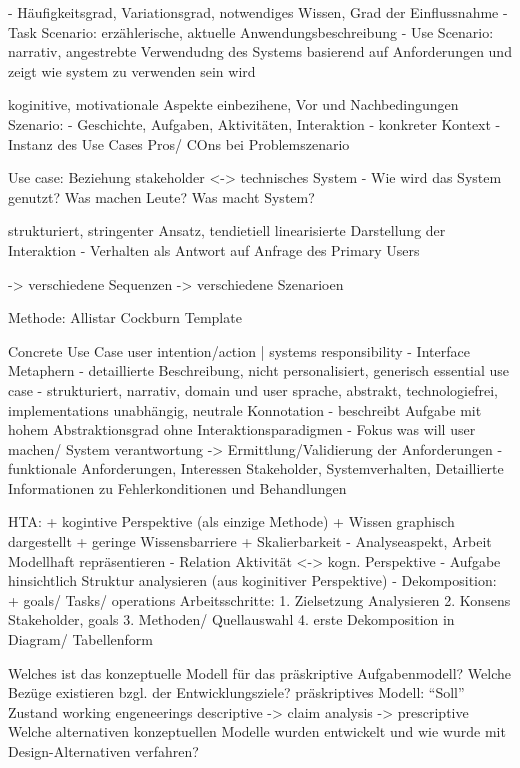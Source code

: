 {\color{blue}
 - Häufigkeitsgrad, Variationsgrad, notwendiges Wissen, Grad der Einflussnahme
        	- Task Scenario: erzählerische, aktuelle Anwendungsbeschreibung
        	- Use Scenario: narrativ, angestrebte Verwendudng des Systems basierend auf Anforderungen und zeigt wie system zu verwenden sein wird
 
koginitive, motivationale Aspekte einbezihene, Vor und Nachbedingungen
Szenario:
        	- Geschichte, Aufgaben, Aktivitäten, Interaktion
        	- konkreter Kontext
        	- Instanz des Use Cases
Pros/ COns bei Problemszenario
 
Use case: Beziehung stakeholder <-> technisches System
        	- Wie wird das System genutzt? Was machen Leute? Was macht System?
        	
strukturiert, stringenter Ansatz, tendietiell linearisierte Darstellung der Interaktion
        	- Verhalten als Antwort auf Anfrage des Primary Users
 
        	-> verschiedene Sequenzen -> verschiedene Szenarioen
 
Methode: Allistar Cockburn Template
 
Concrete Use Case
user intention/action | systems responsibility
- Interface Metaphern
- detaillierte Beschreibung, nicht personalisiert, generisch
essential use case
        	- strukturiert, narrativ, domain und user sprache, abstrakt, technologiefrei, implementations unabhängig, neutrale Konnotation
        	- beschreibt Aufgabe mit hohem Abstraktionsgrad ohne Interaktionsparadigmen
        	- Fokus was will user machen/ System verantwortung
-> Ermittlung/Validierung der Anforderungen
- funktionale Anforderungen, Interessen Stakeholder, Systemverhalten, Detaillierte Informationen zu Fehlerkonditionen und Behandlungen
 
HTA:    + kogintive Perspektive (als einzige Methode)
        	+ Wissen graphisch dargestellt
        	+ geringe Wissensbarriere
        	+ Skalierbarkeit
- Analyseaspekt, Arbeit Modellhaft repräsentieren
- Relation Aktivität <-> kogn. Perspektive
- Aufgabe hinsichtlich Struktur analysieren (aus koginitiver Perspektive)
- Dekomposition: + goals/ Tasks/ operations
Arbeitsschritte:
1. Zielsetzung Analysieren
2. Konsens Stakeholder, goals
3. Methoden/ Quellauswahl
4. erste Dekomposition in Diagram/ Tabellenform


 
Welches ist das konzeptuelle Modell für das präskriptive Aufgabenmodell? Welche Bezüge existieren bzgl. der Entwicklungsziele?
präskriptives Modell: “Soll” Zustand
working engeneerings
descriptive -> claim analysis -> prescriptive
 	Welche alternativen konzeptuellen Modelle wurden entwickelt und wie wurde mit Design-Alternativen verfahren?

}
 
